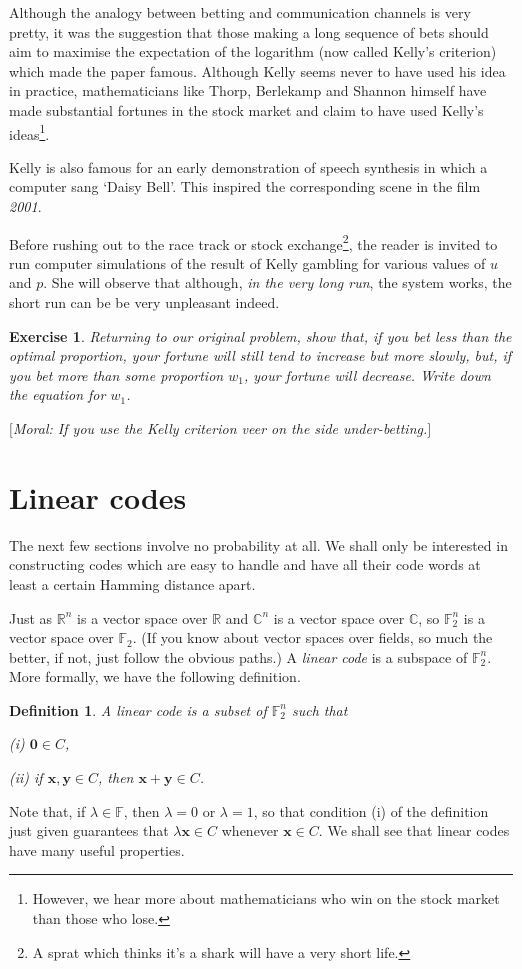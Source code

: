 \documentclass[12pt,a4paper]{article}
\theoremstyle{plain}
\newtheorem{definition}[theorem]{Definition}
\newtheorem{exercise}[theorem]{Exercise}
\theoremstyle{definition}
\begin{document}
Although the analogy between betting and communication
channels is very pretty, it was the suggestion that
those making a long sequence of bets should aim to
maximise the expectation of the logarithm 
(now called Kelly's criterion) which
made the paper famous. Although Kelly 
seems never to have used his idea in practice,
mathematicians like Thorp, Berlekamp and Shannon himself
have made substantial fortunes in the stock market
and claim to have used Kelly's ideas\footnote{However,
we hear more about mathematicians who win on the 
stock market than those who lose.}.

Kelly is also famous for an early demonstration of
speech synthesis in which a computer sang
`Daisy Bell'. This inspired the corresponding
scene in the film \emph{2001}.

Before rushing out to the race track or stock 
exchange\footnote{A sprat which thinks it's a shark
will have a very short life.},
the reader
is invited to run computer simulations of the result
of Kelly gambling for various values of $u$ and $p$.
She will observe that although, \emph{in the very long run},
the system works, the short run can be be very
unpleasant indeed.   
\begin{exercise}\label{E;Slow Kelly} 
Returning to our original problem, show that,
if you bet less than the optimal proportion, your fortune
will still tend to increase but more slowly, but, if you bet
more than some proportion $w_{1}$, your fortune will decrease.
Write down the equation for $w_{1}$.

$[$Moral: If you use the Kelly criterion veer on the side under-betting.$]$
\end{exercise}  
\section{Linear codes} The next few sections involve no
probability at all. We shall only be interested in constructing
codes which are easy to handle and have all their code words
at least a certain Hamming distance apart.

Just as ${\mathbb R}^{n}$ is a
vector space over ${\mathbb R}$ and
${\mathbb C}^{n}$ is a
vector space over ${\mathbb C}$, so
${\mathbb F}_{2}^{n}$ is a
vector space over ${\mathbb F}_{2}$.
(If you know about vector spaces over fields,
so much the better, if not, just follow
the obvious paths.)
A \emph{linear code} is a subspace of ${\mathbb F}_{2}^{n}$.
More formally, we have the following definition.
\begin{definition} A linear code is a subset of
${\mathbb F}_{2}^{n}$ such that

(i) ${\boldsymbol 0}\in C$,

(ii) if ${\mathbf x},{\mathbf y}\in C$,
then ${\mathbf x}+{\mathbf y}\in C$.
\end{definition}
Note that, if $\lambda\in{\mathbb F}$, then $\lambda=0$
or $\lambda=1$, so that condition (i) of the definition
just given guarantees that $\lambda{\mathbf x}\in C$
whenever ${\mathbf x}\in C$. We shall see that
linear codes have many useful properties.
\end{document}
